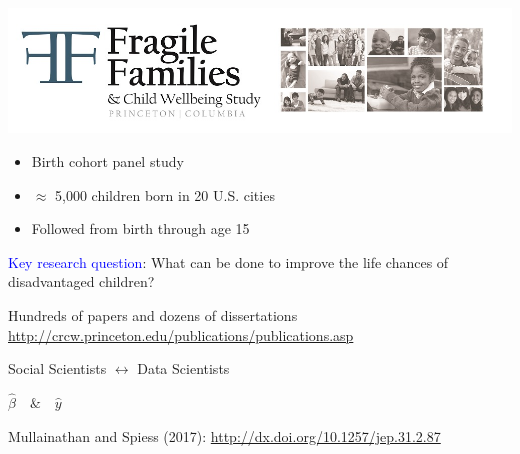 \documentclass{beamer}
\begin{document}
\begin{frame}

\begin{center}
\includegraphics[width=\textwidth]{figures/ff_logo}
\end{center}

\begin{itemize}
\item Birth cohort panel study
\item $\approx$ 5,000 children born in 20 U.S. cities
\item Followed from birth through age 15
\end{itemize}

\textcolor{blue}{Key research question}: What can be done to improve the life chances of disadvantaged children?

\end{frame}
\begin{frame}

Hundreds of papers and dozens of dissertations \vskip 1cm
\scriptsize \url{http://crcw.princeton.edu/publications/publications.asp}

\end{frame}
\begin{frame}

\begin{center}
\large{Social Scientists $\longleftrightarrow$ Data Scientists}
\end{center}
\pause
\begin{center}
\LARGE{
$\hat{\beta} \quad \& \quad \hat{y}$
}
\end{center}

\vfill
Mullainathan and Spiess (2017): \url{http://dx.doi.org/10.1257/jep.31.2.87}
\end{frame}
\end{document}
